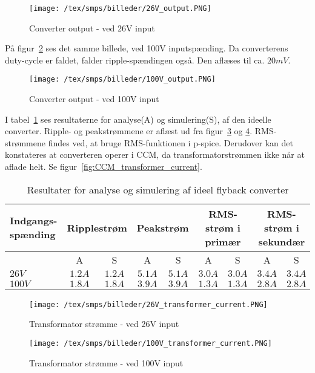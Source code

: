 \begin{figure}[H]
	\center
	\texttt{[image: /tex/smps/billeder/26V\_output.PNG]}
	\caption{Converter output - ved 26V input}
	\label{fig:26V_ideal_output}
\end{figure}

\noindent På figur~\ref{fig:100V_ideal_output} ses det samme billede, ved 100V inputspænding. Da converterens duty-cycle er faldet, falder ripple-spændingen også. Den aflæses til ca. $20mV$. 

\begin{figure}[H]
	\center
	\texttt{[image: /tex/smps/billeder/100V\_output.PNG]}
	\caption{Converter output - ved 100V input}
	\label{fig:100V_ideal_output}
\end{figure}

\noindent I tabel~\ref{tab:result_ideal_converter} ses resultaterne for analyse(A) og simulering(S), af den ideelle converter. Ripple- og peakstrømmene er aflæst ud fra figur~\ref{fig:26V_transformer_current} og \ref{fig:100V_transformer_current}. RMS-strømmene findes ved, at bruge RMS-funktionen i p-spice. Derudover kan det konstateres at converteren operer i CCM, da transformatorstrømmen ikke når at aflade helt. Se figur~\ref{fig:CCM_transformer_current}. 

\begin{table}[H] 			
	\centering
	\begin{tabularx}{\textwidth}{|X|c|c|c|c|c|c|c|c|}
		\hline
		\textbf{Indgangs-spænding} & \multicolumn{2}{|X|}{\textbf{Ripplestrøm}} & \multicolumn{2}{|X|}{\textbf{Peakstrøm}} & \multicolumn{2}{|X|}{\textbf{RMS-strøm i primær}} & \multicolumn{2}{|X|}{\textbf{RMS-strøm i sekundær}} \\ \hline
		& A & S & A & S & A & S & A & S \\ \hline
		$26V$ & $1.2A$ & $1.2A$ & $5.1A$ & $5.1A$ & $3.0A$ & $3.0A$ & $3.4A$ & $3.4A$ \\ \hline 
		$100V$ & $1.8A$ & $1.8A$ & $3.9A$ & $3.9A$ & $1.3A$ & $1.3A$ & $2.8A$ & $2.8A$ \\ \hline
	\end{tabularx}
	\caption{Resultater for analyse og simulering af ideel flyback converter}
	\label{tab:result_ideal_converter}
\end{table}

\begin{figure}[H]
	\center
	\texttt{[image: /tex/smps/billeder/26V\_transformer\_current.PNG]}
	\caption{Transformator strømme - ved 26V input}
	\label{fig:26V_transformer_current}
\end{figure}

\begin{figure}[H]
	\center
	\texttt{[image: /tex/smps/billeder/100V\_transformer\_current.PNG]}
	\caption{Transformator strømme - ved 100V input}
	\label{fig:100V_transformer_current}
\end{figure}



